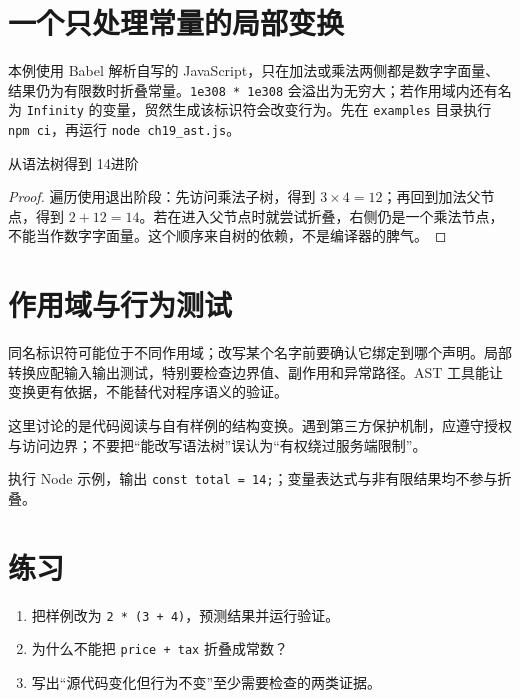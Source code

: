 \section{一个只处理常量的局部变换}
本例使用 Babel 解析自写的 JavaScript，只在加法或乘法两侧都是数字字面量、结果仍为有限数时折叠常量。\texttt{1e308 * 1e308} 会溢出为无穷大；若作用域内还有名为 \texttt{Infinity} 的变量，贸然生成该标识符会改变行为。先在 \texttt{examples} 目录执行 \texttt{npm ci}，再运行 \texttt{node ch19\_ast.js}。

\begin{example}{从语法树得到 14}{进阶}
\end{example}

\begin{proof}
遍历使用退出阶段：先访问乘法子树，得到 $3\times4=12$；再回到加法父节点，得到 $2+12=14$。若在进入父节点时就尝试折叠，右侧仍是一个乘法节点，不能当作数字字面量。这个顺序来自树的依赖，不是编译器的脾气。
\end{proof}

\section{作用域与行为测试}
同名标识符可能位于不同作用域；改写某个名字前要确认它绑定到哪个声明。局部转换应配输入输出测试，特别要检查边界值、副作用和异常路径。AST 工具能让变换更有依据，不能替代对程序语义的验证。

\begin{warning}
这里讨论的是代码阅读与自有样例的结构变换。遇到第三方保护机制，应遵守授权与访问边界；不要把“能改写语法树”误认为“有权绕过服务端限制”。
\end{warning}

\begin{tcolorbox}[title=本章验收,colframe=Teal,colback=Teal!3]
执行 Node 示例，输出 \texttt{const total = 14;}；变量表达式与非有限结果均不参与折叠。
\end{tcolorbox}

\section{练习}
\begin{enumerate}[label=\arabic*.]
\item 把样例改为 \texttt{2 * (3 + 4)}，预测结果并运行验证。
\item 为什么不能把 \texttt{price + tax} 折叠成常数？
\item 写出“源代码变化但行为不变”至少需要检查的两类证据。
\end{enumerate}



